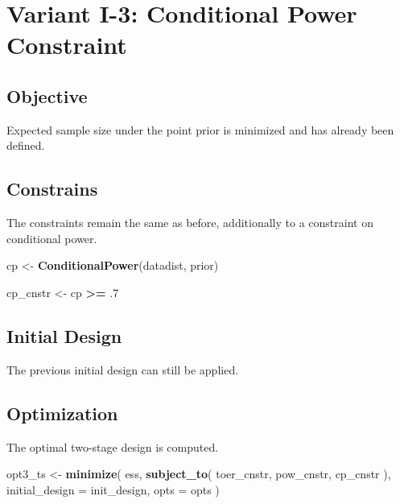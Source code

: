 \documentclass[]{book}
\newenvironment{Shaded}{\begin{snugshade}}{\end{snugshade}}
\newcommand{\DataTypeTok}[1]{\textcolor[rgb]{0.13,0.29,0.53}{#1}}
\newcommand{\FloatTok}[1]{\textcolor[rgb]{0.00,0.00,0.81}{#1}}
\newcommand{\KeywordTok}[1]{\textcolor[rgb]{0.13,0.29,0.53}{\textbf{#1}}}
\newcommand{\NormalTok}[1]{#1}
\newcommand{\OperatorTok}[1]{\textcolor[rgb]{0.81,0.36,0.00}{\textbf{#1}}}
\newcommand{\StringTok}[1]{\textcolor[rgb]{0.31,0.60,0.02}{#1}}
\begin{document}
\hypertarget{variantI_3}{%
\section{Variant I-3: Conditional Power Constraint}\label{variantI_3}}

\hypertarget{objective-2}{%
\subsection{Objective}\label{objective-2}}

Expected sample size under the point prior is minimized and has already been
defined.

\hypertarget{constrains-2}{%
\subsection{Constrains}\label{constrains-2}}

The constraints remain the same as before, additionally to a constraint
on conditional power.

\begin{Shaded}
\begin{Highlighting}[]
\NormalTok{cp <-}\StringTok{ }\KeywordTok{ConditionalPower}\NormalTok{(datadist, prior)}

\NormalTok{cp_cnstr <-}\StringTok{ }\NormalTok{cp }\OperatorTok{>=}\StringTok{ }\FloatTok{.7}
\end{Highlighting}
\end{Shaded}

\hypertarget{initial-design-2}{%
\subsection{Initial Design}\label{initial-design-2}}

The previous initial design can still be applied.

\hypertarget{optimization-2}{%
\subsection{Optimization}\label{optimization-2}}

The optimal two-stage design is computed.

\begin{Shaded}
\begin{Highlighting}[]
\NormalTok{opt3_ts <-}\StringTok{ }\KeywordTok{minimize}\NormalTok{(}
\NormalTok{        ess,}
        \KeywordTok{subject_to}\NormalTok{(}
\NormalTok{            toer_cnstr,}
\NormalTok{            pow_cnstr,}
\NormalTok{            cp_cnstr}
\NormalTok{        ),}
        \DataTypeTok{initial_design =}\NormalTok{ init_design,}
        \DataTypeTok{opts =}\NormalTok{ opts}
\NormalTok{)}
\end{Highlighting}
\end{Shaded}
\end{document}
